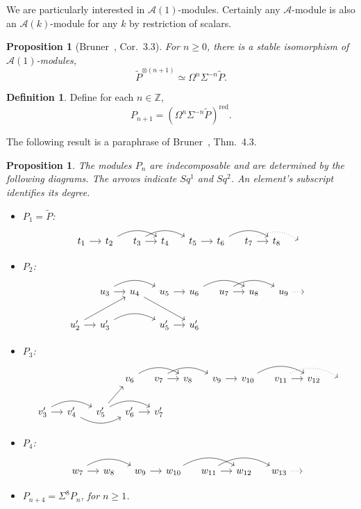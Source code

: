 \documentclass{amsart}
\theoremstyle{plain}
\newtheorem{proposition}[theorem]{Proposition}
\theoremstyle{definition}
\newtheorem{definition}[theorem]{Definition}
\theoremstyle{remark}
\begin{document}
We are particularly interested in $\mathcal{A}(1)$-modules.  Certainly
any $\mathcal{A}$-module is also an $\mathcal{A}(k)$-module for any
$k$ by restriction of scalars.
\begin{proposition}[Bruner~\cite{Bruner}, Cor.~3.3]
  For $n \geq 0$, there is a stable isomorphism of
  $\mathcal{A}(1)$-modules,
  \[
    \widetilde{P}^{\otimes (n+1)} \simeq
    \Omega^n\Sigma^{-n}\widetilde{P}.
  \]
\end{proposition}
\begin{definition}
  Define for each $n \in {\mathbb{Z}}$,
  \[
    P_{n+1} =
    \left(\Omega^n\Sigma^{-n}\widetilde{P}\right)^{\mathrm{red}}.
  \]
\end{definition}
The following result is a paraphrase of Bruner~\cite{Bruner},
Thm.~4.3.
\begin{proposition}\label{prp.P_n_structure}
  The modules $P_n$ are indecomposable and are determined by the
  following diagrams.  The arrows indicate $Sq^1$ and $Sq^2$.  An
  element's subscript identifies its degree.
  \begin{itemize}
    \item $P_1 = \widetilde{P}$:
      \[
        \begin{tikzcd}[column sep=small]
          t_1 \rar & t_2 \arrow[bend left]{rr} & t_3 \rar \arrow[bend
            left]{rr} & t_4 & t_5 \rar & t_6 \arrow[bend left]{rr} &
          t_7 \rar \arrow[dotted,bend left]{rr} & t_8 & {}
        \end{tikzcd}
      \]
    \item $P_2$:
      \[
        \begin{tikzcd}[column sep=small]
          & u_3 \rar \arrow[bend left]{rr} & u_4 \arrow{rrd} & u_5
          \rar & u_6 \arrow[bend left]{rr} & u_7 \rar \arrow[bend
            left]{rr} & u_8 & u_9 \rar[dotted] & {} \\ u'_2 \rar
          \arrow{rru} & u'_3 \arrow[bend left]{rr} & & u'_5 \rar &
          u'_6
        \end{tikzcd}
      \]
    \item $P_3$:
      \[
        \begin{tikzcd}[column sep=small]
          &&& v_6 \arrow[bend left]{rr} & v_7 \rar \arrow[bend
            left]{rr} & v_8 & v_9 \rar & v_{10} \arrow[bend left]{rr}
          & v_{11} \arrow[dotted,bend left]{rr} \rar & v_{12} & {}
          \\ v'_3 \rar \arrow[bend left]{rr} & v'_4 \arrow[bend
            right]{rr} & v'_5 \arrow{ru} \arrow[bend left]{rr} & v'_6
          \rar & v'_7
        \end{tikzcd}
      \]
    \item $P_4$:
      \[
        \begin{tikzcd}[column sep=small]
          w_7 \rar \arrow[bend left]{rr} & w_8 & w_9 \rar & w_{10}
          \arrow[bend left]{rr} & w_{11} \rar \arrow[bend left]{rr} &
          w_{12} & w_{13} \rar[dotted] & {}
        \end{tikzcd}
      \]
    \item $P_{n+4} = \Sigma^8P_n$, for $n \geq 1$.
  \end{itemize}
\end{proposition}
\end{document}
